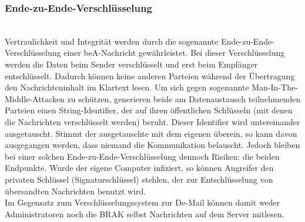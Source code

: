 \subsubsection{Ende-zu-Ende-Verschlüsselung}\hspace*{\fill} \\
Vertraulichkeit und Integrität werden durch die sogenannte Ende-zu-Ende-Verschlüsselung einer beA-Nachricht gewährleistet. Bei dieser Verschlüsselung werden die Daten beim Sender verschlüsselt und erst beim Empfänger entschlüsselt. Dadurch können keine anderen Parteien während der Übertragung den Nachrichteninhalt im Klartext lesen. Um sich gegen sogenannte Man-In-The-Middle-Attacken zu schützen, generieren beide am Datenaustausch teilnehmenden Parteien einen String-Identifier, der auf ihren öffentlichen Schlüsseln (mit denen die Nachrichten verschlüsselt werden) beruht. Dieser Identifier wird untereinander ausgetauscht. Stimmt der ausgetauschte mit dem eigenen überein, so kann davon ausgegangen werden, dass niemand die Kommunikation belauscht. Jedoch bleiben bei einer solchen Ende-zu-Ende-Verschlüsselung dennoch Risiken: die beiden Endpunkte. Wurde der eigene Computer infiziert, so können Angreifer den privaten Schlüssel (Signaturschlüssel) stehlen, der zur Entschlüsselung von übersandten Nachrichten benutzt wird. \\
Im Gegensatz zum Verschlüsselungssystem zur De-Mail können damit weder Administratoren noch die BRAK selbst Nachrichten auf dem Server mitlesen.

